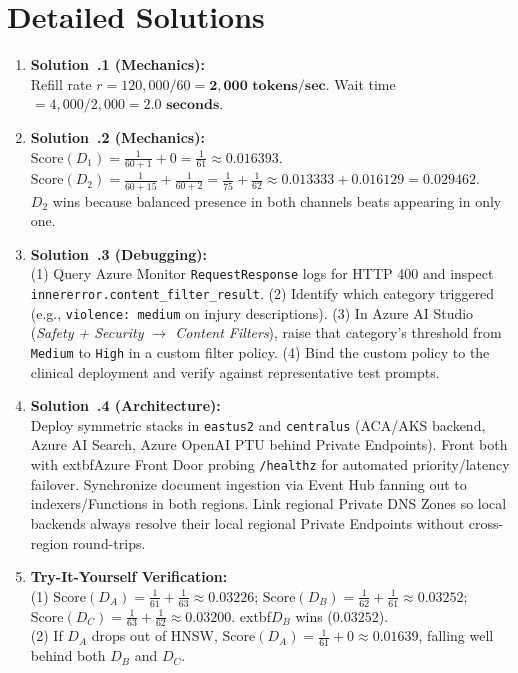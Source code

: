 \section{Detailed Solutions}
\begin{enumerate}[leftmargin=18pt]
  \item \textbf{Solution~\thechapter.1 (Mechanics):}\\
  Refill rate $r = 120{,}000 / 60 = \mathbf{2{,}000\text{ tokens/sec}}$. Wait time $= 4{,}000 / 2{,}000 = \mathbf{2.0\text{ seconds}}$.

  \item \textbf{Solution~\thechapter.2 (Mechanics):}\\
  $\text{Score}(D_1) = \frac{1}{60+1} + 0 = \frac{1}{61} \approx 0.016393$.\\
  $\text{Score}(D_2) = \frac{1}{60+15} + \frac{1}{60+2} = \frac{1}{75} + \frac{1}{62} \approx 0.013333 + 0.016129 = \mathbf{0.029462}$.\\
  $D_2$ wins because balanced presence in both channels beats appearing in only one.

  \item \textbf{Solution~\thechapter.3 (Debugging):}\\
  (1) Query Azure Monitor \texttt{RequestResponse} logs for HTTP 400 and inspect \texttt{innererror.content\_filter\_result}. (2) Identify which category triggered (e.g., \texttt{violence: medium} on injury descriptions). (3) In Azure AI Studio (\emph{Safety + Security $\to$ Content Filters}), raise that category's threshold from \texttt{Medium} to \texttt{High} in a custom filter policy. (4) Bind the custom policy to the clinical deployment and verify against representative test prompts.

  \item \textbf{Solution~\thechapter.4 (Architecture):}\\
  Deploy symmetric stacks in \texttt{eastus2} and \texttt{centralus} (ACA/AKS backend, Azure AI Search, Azure OpenAI PTU behind Private Endpoints). Front both with 	extbf{Azure Front Door} probing \texttt{/healthz} for automated priority/latency failover. Synchronize document ingestion via Event Hub fanning out to indexers/Functions in both regions. Link regional Private DNS Zones so local backends always resolve their local regional Private Endpoints without cross-region round-trips.

  \item \textbf{Try-It-Yourself Verification:}\\
  (1) $\text{Score}(D_A) = \frac{1}{61} + \frac{1}{63} \approx 0.03226$; $\text{Score}(D_B) = \frac{1}{62} + \frac{1}{61} \approx \mathbf{0.03252}$; $\text{Score}(D_C) = \frac{1}{63} + \frac{1}{62} \approx 0.03200$. 	extbf{$D_B$ wins} ($0.03252$).\\
  (2) If $D_A$ drops out of HNSW, $\text{Score}(D_A) = \frac{1}{61} + 0 \approx 0.01639$, falling well behind both $D_B$ and $D_C$.
\end{enumerate}

